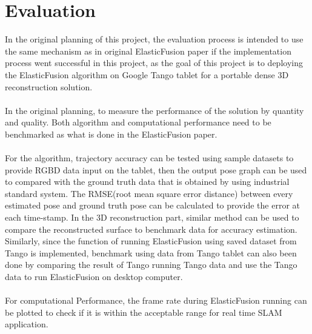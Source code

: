 \documentclass[12pt,twoside]{article}
\begin{document}
\section{Evaluation}
In the original planning of this project, the evaluation process is intended to use the same mechanism as in original ElasticFusion\citep{whelan2016elasticfusion} paper if the implementation process went successful in this project, as the goal of this project is to deploying the ElasticFusion algorithm on Google Tango tablet for a portable dense 3D reconstruction solution.\\
\\
In the original planning, to measure the performance of the solution by quantity and quality. Both algorithm and computational performance need to be benchmarked as what is done in the ElasticFusion\citep{whelan2016elasticfusion} paper.\\
\\
For the algorithm, trajectory accuracy can be tested using sample datasets to provide RGBD data input on the tablet, then the output pose graph can be used to compared with the ground truth data that is obtained by using industrial standard system. The RMSE(root mean square error distance) between every estimated pose and ground truth pose can be calculated to provide the error at each time-stamp. In the 3D reconstruction part, similar method can be used to compare the reconstructed surface to benchmark data for accuracy estimation. Similarly, since the function of running ElasticFusion using saved dataset from Tango is implemented, benchmark using data from Tango tablet can also been done by comparing the result of Tango running Tango data and use the Tango data to run ElasticFusion on desktop computer.\\
\\
For computational Performance, the frame rate during ElasticFusion running can be plotted to check if it is within the acceptable range for real time SLAM application.\\
\\
\end{document}
